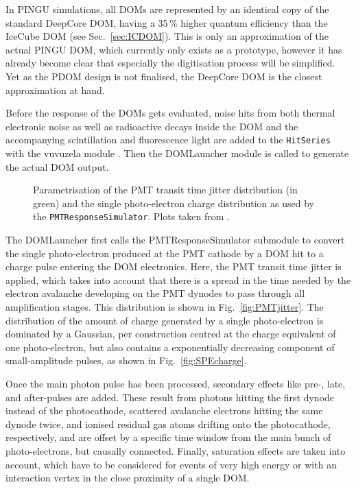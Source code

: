 In PINGU simulations, all DOMs are represented by an identical copy of the
standard DeepCore DOM, having a 35\,\% higher quantum efficiency than the
IceCube DOM (see Sec.~\ref{sec:ICDOM}). This is only an approximation of the
actual PINGU DOM, which currently only exists as a prototype, however it has
already become clear that especially the digitisation process will be
simplified. Yet as the PDOM design is not finalised, the DeepCore DOM is the
closest approximation at hand.

Before the response of the DOMs gets evaluated, noise hits from both thermal
electronic noise as well as radioactive decays inside the DOM and the
accompanying scintillation and fluorescence light are added to the
\texttt{HitSeries} with the vuvuzela module \cite{vuvuzela}. Then the
DOMLauncher module \cite{DOMLauncher} is called to generate the actual DOM
output.

\begin{figure}
\centering
  \subfloat[\label{fig:SPEcharge}]
    {\texttt{[image: TA0003]}}
  \caption{Parametrisation of \protect{} the PMT transit
       time jitter distribution (in green) and \protect{}
       the single photo-electron charge distribution as used by the
       \texttt{PMTResponseSimulator}. Plots taken from \cite{PMTRes}.}
\label{fig:PMTRes}
\end{figure}

The DOMLauncher first calls the PMTResponseSimulator submodule \cite{PMTRes} to
convert the single photo-electron produced at the PMT cathode by a DOM hit to a
charge pulse entering the DOM electronics. Here, the PMT transit time jitter is
applied, which takes into account that there is a spread in the time needed by
the electron
avalanche developing on the PMT dynodes to pass through all amplification
stages. This distribution is shown in Fig.~\ref{fig:PMTjitter}. The
distribution of the amount of charge generated by a single photo-electron is
dominated by a Gaussian, per construction centred at the charge equivalent of
one photo-electron, but also contains a exponentially decreasing component of
small-amplitude pulses, as shown in Fig.~\ref{fig:SPEcharge}.

Once the main photon pulse has been processed, secondary effects like pre-,
late, and after-pulses are added. These result from photons hitting the first
dynode instead of the photocathode, scattered avalanche electrons hitting the
same dynode twice, and ionised residual gas atoms drifting onto the
photocathode, respectively, and are offset by a specific time window from the
main bunch of photo-electrons, but causally connected. Finally, saturation
effects are taken into account, which have to be considered for events of very
high energy or with an interaction vertex in the close proximity of a single
DOM.

